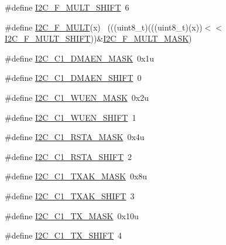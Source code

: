 \begin{DoxyCompactItemize}
\#define \hyperlink{group___i2_c___register___masks_ga3a338cb3af4c140fde82427d091d5b4a}{I2\+C\+\_\+\+F\+\_\+\+M\+U\+L\+T\+\_\+\+S\+H\+I\+FT}~6
\item 
\#define \hyperlink{group___i2_c___register___masks_ga49d79434c3f1d51dce271f7100559aea}{I2\+C\+\_\+\+F\+\_\+\+M\+U\+LT}(x)                                                    ~(((uint8\+\_\+t)(((uint8\+\_\+t)(x))$<$$<$\hyperlink{group___i2_c___register___masks_ga3a338cb3af4c140fde82427d091d5b4a}{I2\+C\+\_\+\+F\+\_\+\+M\+U\+L\+T\+\_\+\+S\+H\+I\+FT}))\&\hyperlink{group___i2_c___register___masks_ga9e077caa9ac07c03f5e34e431d0806fa}{I2\+C\+\_\+\+F\+\_\+\+M\+U\+L\+T\+\_\+\+M\+A\+SK})
\item 
\#define \hyperlink{group___i2_c___register___masks_gadfd8fccdd35a4944a1e53ffa26e5d06b}{I2\+C\+\_\+\+C1\+\_\+\+D\+M\+A\+E\+N\+\_\+\+M\+A\+SK}~0x1u
\item 
\#define \hyperlink{group___i2_c___register___masks_ga1cd5f87cc18a56d293697f0463e2a9e3}{I2\+C\+\_\+\+C1\+\_\+\+D\+M\+A\+E\+N\+\_\+\+S\+H\+I\+FT}~0
\item 
\#define \hyperlink{group___i2_c___register___masks_ga708d3eded28946d6f2e4b7ed5aff8fe8}{I2\+C\+\_\+\+C1\+\_\+\+W\+U\+E\+N\+\_\+\+M\+A\+SK}~0x2u
\item 
\#define \hyperlink{group___i2_c___register___masks_gad1bec740751b47fd0f4e02d913c3b287}{I2\+C\+\_\+\+C1\+\_\+\+W\+U\+E\+N\+\_\+\+S\+H\+I\+FT}~1
\item 
\#define \hyperlink{group___i2_c___register___masks_ga656f6747e8edc8299767365ea1ac9d70}{I2\+C\+\_\+\+C1\+\_\+\+R\+S\+T\+A\+\_\+\+M\+A\+SK}~0x4u
\item 
\#define \hyperlink{group___i2_c___register___masks_gac6c61e0bd2615da3bbc3079984192dd7}{I2\+C\+\_\+\+C1\+\_\+\+R\+S\+T\+A\+\_\+\+S\+H\+I\+FT}~2
\item 
\#define \hyperlink{group___i2_c___register___masks_gaebf88a6e1a433272e606980474b4e577}{I2\+C\+\_\+\+C1\+\_\+\+T\+X\+A\+K\+\_\+\+M\+A\+SK}~0x8u
\item 
\#define \hyperlink{group___i2_c___register___masks_ga95ea65244938ce40ca695f5193268357}{I2\+C\+\_\+\+C1\+\_\+\+T\+X\+A\+K\+\_\+\+S\+H\+I\+FT}~3
\item 
\#define \hyperlink{group___i2_c___register___masks_gaf2c2222f863ed79996904cac957fbcf2}{I2\+C\+\_\+\+C1\+\_\+\+T\+X\+\_\+\+M\+A\+SK}~0x10u
\item 
\#define \hyperlink{group___i2_c___register___masks_ga4785c943be6e7664aad1f3166c54c07c}{I2\+C\+\_\+\+C1\+\_\+\+T\+X\+\_\+\+S\+H\+I\+FT}~4
\item 
$$
\end{DoxyCompactItemize}
